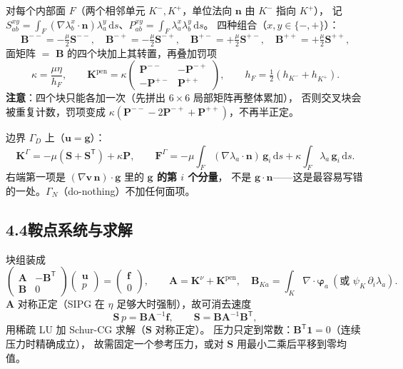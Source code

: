 \documentclass[UTF8,11pt,a4paper]{ctexart}
\theoremstyle{wjplain}
\theoremstyle{wjdef}
\newcommand{\dd}{\,\mathrm{d}}
\newcommand{\bn}{\boldsymbol n}
\newcommand{\bu}{\boldsymbol u}
\newcommand{\bv}{\boldsymbol v}
\newcommand{\bg}{\boldsymbol g}
\newcommand{\bK}{\boldsymbol K}
\newcommand{\bP}{\boldsymbol P}
\newcommand{\bA}{\boldsymbol A}
\newcommand{\bB}{\boldsymbol B}
\newcommand{\bS}{\boldsymbol S}
\newcommand{\bvarphi}{\boldsymbol\varphi}
\newcommand{\bF}{\boldsymbol F}
\newcommand{\grad}{\nabla}
\newcommand{\dive}{\nabla\cdot}
\begin{document}
对每个内部面 $F$（两个相邻单元 $K^-,K^+$，单位法向 $\bn$ 由 $K^-$ 指向 $K^+$），
记 $S^{xy}_{ab}=\int_F(\grad\lambda^x_b\cdot\bn)\lambda^y_a\dd s$、$P^{xy}_{ab}=\int_F\lambda^x_a\lambda^y_b\dd s$。
四种组合（$x,y\in\{-,+\}$）：
\begin{equation}\tag{4.4}
  \bB^{--}=-\tfrac{\mu}{2}\bS^{--},\quad
  \bB^{-+}=-\tfrac{\mu}{2}\bS^{-+},\quad
  \bB^{+-}=+\tfrac{\mu}{2}\bS^{+-},\quad
  \bB^{++}=+\tfrac{\mu}{2}\bS^{++},
\end{equation}
面矩阵 $=$ $\bB$ 的四个块加上其转置，再叠加罚项
\begin{equation}\tag{4.5}
  \kappa=\frac{\mu\eta}{h_F},\qquad
  \bK^{\text{pen}}=\kappa
  \begin{pmatrix}\bP^{--}&-\bP^{-+}\\-\bP^{+-}&\bP^{++}\end{pmatrix},
  \qquad h_F=\tfrac12(h_{K^-}+h_{K^+}).
\end{equation}
\textbf{注意}：四个块只能各加一次（先拼出 $6\times6$ 局部矩阵再整体累加），
否则交叉块会被重复计数，罚项变成 $\kappa(\bP^{--}-2\bP^{-+}+\bP^{++})$，不再半正定。

边界 $\Gamma_D$ 上（$\bu=\bg$）：
\begin{equation}\tag{4.6}
  \bK^\Gamma=-\mu(\bS+\bS^{\mathsf T})+\kappa\bP,\qquad
  \bF^\Gamma=-\mu\int_F(\grad\lambda_a\cdot\bn)\,\bg_i\dd s
  +\kappa\int_F\lambda_a\,\bg_i\dd s .
\end{equation}
右端第一项是 $(\grad\bv\,\bn)\cdot\bg$ 里的 \textbf{$\bg$ 的第 $i$ 个分量}，
不是 $\bg\cdot\bn$——这是最容易写错的一处。$\Gamma_N$（do-nothing）不加任何面项。

\subsection*{4.4\quad 鞍点系统与求解}

块组装成
\begin{equation}\tag{4.7}
  \begin{pmatrix}\bA&-\bB^{\mathsf T}\\\bB&0\end{pmatrix}
  \begin{pmatrix}\bu\\ p\end{pmatrix}
  =\begin{pmatrix}\boldsymbol f\\ 0\end{pmatrix},
  \qquad
  \bA=\bK^\nu+\bK^{\text{pen}},\quad
  \bB_{Ka}=\int_K\dive\bvarphi_a\ (\text{或 } \psi_K\,\partial_i\lambda_a).
\end{equation}
$\bA$ 对称正定（SIPG 在 $\eta$ 足够大时强制），故可消去速度
\begin{equation}\tag{4.8}
  \bS\,p=\bB\bA^{-1}\boldsymbol f,\qquad \bS=\bB\bA^{-1}\bB^{\mathsf T},
\end{equation}
用稀疏 LU 加 Schur-CG 求解（$\bS$ 对称正定）。
压力只定到常数：$\bB^{\mathsf T}\boldsymbol 1=0$（连续压力时精确成立），
故需固定一个参考压力，或对 $\bS$ 用最小二乘后平移到零均值。
\end{document}
